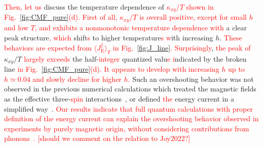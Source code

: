 \documentclass[twocolumn,superscriptaddress,showpacs, longbibliography, aps, prb]{revtex4-2}
\newcommand{\red}[1]{\textcolor{red}{#1}}
\newcommand{\blue}[1]{\textcolor{blue}{#1}}
\newcommand{\orange}[1]{\textcolor{orange}{#1}}
\begin{document}
\red{Then, let us} discuss the temperature dependence of %
\red{$\kappa_{xy}/T$ shown in Fig.~\ref{fig:CMF_pure}(d).} 
\red{First of all, $\kappa_{xy}/T$ is overall positive, except for small $h$ and low $T$,  
and exhibits a nonmonotonic temperature dependence with} a clear peak structure\red{, which} %
shift\red{s} to %
higher temperature\red{s %
w}ith increasing %
$h$. 
\red{These behaviors are expected from $\langle J_{\mathrm{E}}^\parallel \rangle_T$ in Fig.~\ref{fig:J_line}.} 
\red{Surprisingly}, \red{the peak of} $\kappa_{xy}/T$ %
\red{largely exceeds} the half-\red{integer} quantized valu\red{e %
i}ndicated by the broken line \red{in Fig.~\ref{fig:CMF_pure}(d).} %
\red{It appears to develop with increasing $h$ up to $h\simeq 0.04$ and slowly decline for higher $h$.} 
Such an overshooting behavior was not observed in the previous numerical calculations %
which 
treated the magnetic fields as the effective three-\red{spin} %
interactions~\cite{NasuYM2017}, or defined \red{the} energy current in a simplified way~\cite{KumarT2023}. %
\red{Our results indicate that full quantum calculations with proper definition of the energy current can explain the overshooting behavior observed in experiments by purely magnetic origin, without considering contributions from phonons~\cite{Ye2018Quantization,Vinkler2018}.} 
\red{[should we comment on the relation to Joy2022?]} 
\end{document}
